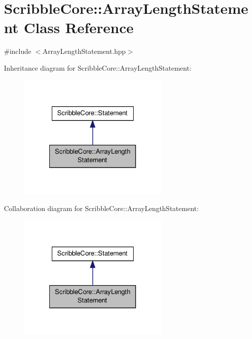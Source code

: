 \hypertarget{class_scribble_core_1_1_array_length_statement}{\section{Scribble\-Core\-:\-:Array\-Length\-Statement Class Reference}
\label{class_scribble_core_1_1_array_length_statement}
}


{\ttfamily \#include $<$Array\-Length\-Statement.\-hpp$>$}



Inheritance diagram for Scribble\-Core\-:\-:Array\-Length\-Statement\-:\nopagebreak
\begin{figure}[H]
\begin{center}
\leavevmode
\includegraphics[width=210pt]{class_scribble_core_1_1_array_length_statement__inherit__graph}
\end{center}
\end{figure}


Collaboration diagram for Scribble\-Core\-:\-:Array\-Length\-Statement\-:\nopagebreak
\begin{figure}[H]
\begin{center}
\leavevmode
\includegraphics[width=210pt]{class_scribble_core_1_1_array_length_statement__coll__graph}
\end{center}
\end{figure}
